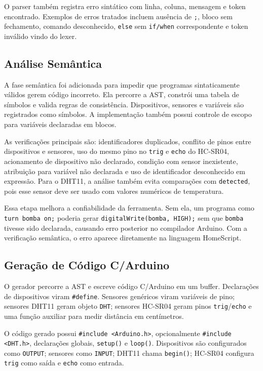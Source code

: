 \documentclass[conference]{IEEEtran}
\begin{document}
O parser também registra erro sintático com linha, coluna, mensagem e token encontrado. Exemplos de erros tratados incluem ausência de \texttt{;}, bloco sem fechamento, comando desconhecido, \texttt{else} sem \texttt{if/when} correspondente e token inválido vindo do lexer.

\subsection{Análise Semântica}
A fase semântica foi adicionada para impedir que programas sintaticamente válidos gerem código incorreto. Ela percorre a AST, constrói uma tabela de símbolos e valida regras de consistência. Dispositivos, sensores e variáveis são registrados como símbolos. A implementação também possui controle de escopo para variáveis declaradas em blocos.

As verificações principais são: identificadores duplicados, conflito de pinos entre dispositivos e sensores, uso do mesmo pino no \texttt{trig} e \texttt{echo} do HC-SR04, acionamento de dispositivo não declarado, condição com sensor inexistente, atribuição para variável não declarada e uso de identificador desconhecido em expressão. Para o DHT11, a análise também evita comparações com \texttt{detected}, pois esse sensor deve ser usado com valores numéricos de temperatura.

Essa etapa melhora a confiabilidade da ferramenta. Sem ela, um programa como \texttt{turn bomba on;} poderia gerar \texttt{digitalWrite(bomba, HIGH);} sem que \texttt{bomba} tivesse sido declarada, causando erro posterior no compilador Arduino. Com a verificação semântica, o erro aparece diretamente na linguagem HomeScript.

\subsection{Geração de Código C/Arduino}
O gerador percorre a AST e escreve código C/Arduino em um buffer. Declarações de dispositivos viram \texttt{\#define}. Sensores genéricos viram variáveis de pino; sensores DHT11 geram objeto \texttt{DHT}; sensores HC-SR04 geram pinos \texttt{trig}/\texttt{echo} e uma função auxiliar para medir distância em centímetros.

O código gerado possui \texttt{\#include <Arduino.h>}, opcionalmente \texttt{\#include <DHT.h>}, declarações globais, \texttt{setup()} e \texttt{loop()}. Dispositivos são configurados como \texttt{OUTPUT}; sensores como \texttt{INPUT}; DHT11 chama \texttt{begin()}; HC-SR04 configura \texttt{trig} como saída e \texttt{echo} como entrada.
\end{document}
